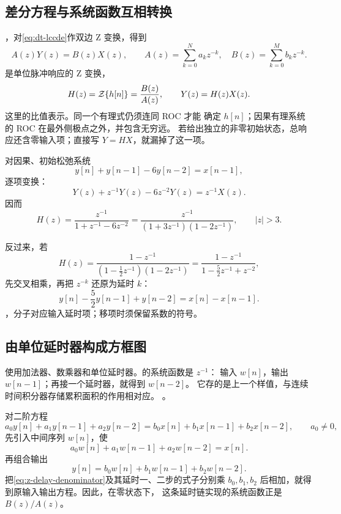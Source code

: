 \subsection{差分方程与系统函数互相转换}
\label{subsec:z-system-function}

，对\cref{eq:dt-lccde}作双边 Z 变换，得到
\[
  A(z)Y(z)=B(z)X(z),\qquad
  A(z)=\sum_{k=0}^{N}a_kz^{-k},\quad
  B(z)=\sum_{k=0}^{M}b_kz^{-k}.
\]
是单位脉冲响应的 Z 变换，
\begin{equation}
  H(z)=\mathcal{Z}\{h[n]\}=\frac{B(z)}{A(z)},\qquad
  Y(z)=H(z)X(z).
  \label{eq:z-system-function-ratio}
\end{equation}
这里的比值表示。同一个有理式仍须连同 ROC 才能
确定 $h[n]$；因果有理系统的 ROC 在最外侧极点之外，并包含无穷远。
若给出独立的非零初始状态，总响应还含零输入项；直接写 $Y=HX$，就漏掉了这一项。

\begin{example}
\label{eg:z-equation-system-function}
  对因果、初始松弛系统
  \[
    y[n]+y[n-1]-6y[n-2]=x[n-1],
  \]
  逐项变换：
  \[
    Y(z)+z^{-1}Y(z)-6z^{-2}Y(z)=z^{-1}X(z).
  \]
  因而
  \[
    H(z)=\frac{z^{-1}}{1+z^{-1}-6z^{-2}}
    =\frac{z^{-1}}{(1+3z^{-1})(1-2z^{-1})},
    \qquad |z|>3.
  \]

  反过来，若
  \[
    H(z)=\frac{1-z^{-1}}
      {(1-\frac12z^{-1})(1-2z^{-1})}
    =\frac{1-z^{-1}}{1-\frac52z^{-1}+z^{-2}},
  \]
  先交叉相乘，再把 $z^{-k}$ 还原为延时 $k$：
  \[
    \boxed{y[n]-\frac52y[n-1]+y[n-2]=x[n]-x[n-1]}.
  \]
  ，分子对应输入延时项；移项时须保留系数的符号。
\end{example}

\subsection{由单位延时器构成方框图}
\label{sec:dt-block-diagram}

使用加法器、数乘器和单位延时器。的系统函数是 $z^{-1}$：
输入 $w[n]$，输出 $w[n-1]$；再接一个延时器，就得到 $w[n-2]$。
它存的是上一个样值，与连续时间积分器存储累积面积的作用相对应。
。

对二阶方程
\[
  a_0y[n]+a_1y[n-1]+a_2y[n-2]
  =b_0x[n]+b_1x[n-1]+b_2x[n-2],
  \qquad a_0\ne0,
\]
先引入中间序列 $w[n]$，使
\begin{equation}
  a_0w[n]+a_1w[n-1]+a_2w[n-2]=x[n].
  \label{eq:z-delay-denominator}
\end{equation}
再组合输出
\begin{equation}
  y[n]=b_0w[n]+b_1w[n-1]+b_2w[n-2].
  \label{eq:z-delay-numerator}
\end{equation}
把\cref{eq:z-delay-denominator}及其延时一、二步的式子分别乘
$b_0,b_1,b_2$ 后相加，就得到原输入输出方程。因此，在零状态下，
这条延时链实现的系统函数正是 $B(z)/A(z)$。

